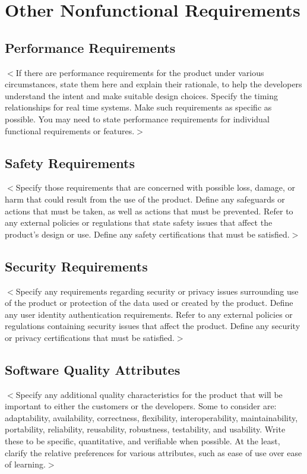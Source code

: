 \documentclass{scrreprt}
\begin{document}
\chapter{Other Nonfunctional Requirements}

\section{Performance Requirements}
$<$If there are performance requirements for the product under various 
circumstances, state them here and explain their rationale, to help the 
developers understand the intent and make suitable design choices. Specify the 
timing relationships for real time systems. Make such requirements as specific 
as possible. You may need to state performance requirements for individual 
functional requirements or features.$>$

\section{Safety Requirements}
$<$Specify those requirements that are concerned with possible loss, damage, or 
harm that could result from the use of the product. Define any safeguards or 
actions that must be taken, as well as actions that must be prevented. Refer to 
any external policies or regulations that state safety issues that affect the 
product’s design or use. Define any safety certifications that must be 
satisfied.$>$

\section{Security Requirements}
$<$Specify any requirements regarding security or privacy issues surrounding use 
of the product or protection of the data used or created by the product. Define 
any user identity authentication requirements. Refer to any external policies or 
regulations containing security issues that affect the product. Define any 
security or privacy certifications that must be satisfied.$>$

\section{Software Quality Attributes}
$<$Specify any additional quality characteristics for the product that will be 
important to either the customers or the developers. Some to consider are: 
adaptability, availability, correctness, flexibility, interoperability, 
maintainability, portability, reliability, reusability, robustness, testability, 
and usability. Write these to be specific, quantitative, and verifiable when 
possible. At the least, clarify the relative preferences for various attributes, 
such as ease of use over ease of learning.$>$
\end{document}
